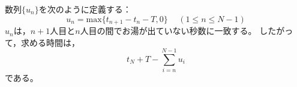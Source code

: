\documentclass{article}
\begin{document}
数列$\{u_n\}$を次のように定義する：
\begin{equation*}
    u_n = \mathrm{max}\{t_{n + 1} - t_n - T, 0\} \hspace{15pt} (1 \leq n \leq N - 1)
\end{equation*}
$u_n$は，$n + 1$人目と$n$人目の間でお湯が出ていない秒数に一致する。
したがって，求める時間は，
\begin{equation*}
    t_N + T - \sum_{i = n}^{N - 1} u_i
\end{equation*}
である。
\end{document}
